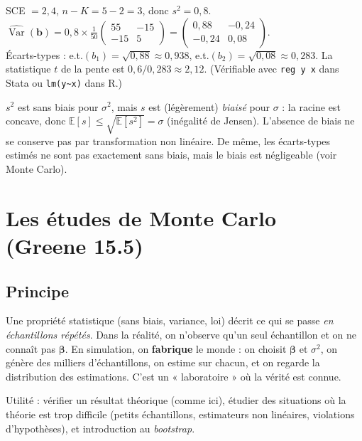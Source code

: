 \documentclass[11pt,a4paper]{article}
\newcommand{\vb}{\mathbf{b}}
\newcommand{\vbeta}{\bm{\beta}}
\newcommand{\E}{\mathbb{E}}
\newcommand{\Var}{\operatorname{Var}}
\begin{document}
\begin{exemple}
SCE $=2{,}4$, $n-K=5-2=3$, donc $s^2=0{,}8$. \ $\widehat{\Var}(\vb)=0{,}8\times\frac1{50}\begin{pmatrix}55&-15\\-15&5\end{pmatrix}=\begin{pmatrix}0{,}88&-0{,}24\\-0{,}24&0{,}08\end{pmatrix}$.
\\Écarts-types : e.t.$(b_1)=\sqrt{0{,}88}\approx0{,}938$, e.t.$(b_2)=\sqrt{0{,}08}\approx0{,}283$. La statistique $t$ de la pente est $0{,}6/0{,}283\approx2{,}12$. (Vérifiable avec \texttt{reg y x} dans Stata ou \texttt{lm(y\textasciitilde x)} dans R.)
\end{exemple}

\begin{attention}
$s^2$ est sans biais pour $\sigma^2$, mais $s$ est (légèrement) \emph{biaisé} pour $\sigma$ : la racine est concave, donc $\E[s]\le\sqrt{\E[s^2]}=\sigma$ (inégalité de Jensen). L'absence de biais ne se conserve pas par transformation non linéaire. De même, les écarts-types estimés ne sont pas exactement sans biais, mais le biais est négligeable (voir Monte Carlo).
\end{attention}

\section{Les études de Monte Carlo (Greene 15.5)}\label{sec:mc}

\subsection{Principe}
Une propriété statistique (sans biais, variance, loi) décrit ce qui se passe \emph{en échantillons répétés}. Dans la réalité, on n'observe qu'un seul échantillon et on ne connaît pas $\vbeta$. En simulation, on \textbf{fabrique} le monde : on choisit $\vbeta$ et $\sigma^2$, on génère des milliers d'échantillons, on estime sur chacun, et on regarde la distribution des estimations. C'est un « laboratoire » où la vérité est connue.

Utilité : vérifier un résultat théorique (comme ici), étudier des situations où la théorie est trop difficile (petits échantillons, estimateurs non linéaires, violations d'hypothèses), et introduction au \emph{bootstrap}.
\end{document}
